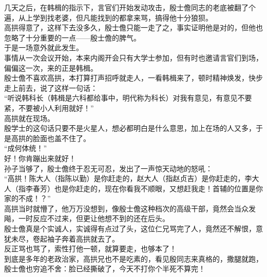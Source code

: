 \begin{multicols}{\theparacolNo}
几天之后，在韩楫的指示下，言官们开始发动攻击，殷士儋同志的老底被翻了个遍，从上学到找老婆，但凡能找到的都拿来骂，搞得他十分狼狈。\\

高拱得意了，这样下去没多久，殷士儋只能一走了之，事实证明他是对的，但他也忽略了十分重要的一点——殷士儋的脾气。\\

于是一场意外就此发生。\\

事情从一次会议开始，本来内阁开会只有大学士参加，但有时也邀请言官们到场，偏偏这一次，来的正是韩楫。\\

殷士儋不喜欢高拱，本打算打声招呼就走人，一看韩楫来了，顿时精神焕发，快步走上前去，说了这样一句话：\\

“听说韩科长（韩楫是六科都给事中，明代称为科长）对我有意见，有意见不要紧，不要被小人利用就好！”\\

高拱就在现场。\\

殷学士的这句话只要不是火星人，想必都明白是什么意思，加上在场的人又多，于是高拱的脸面也盖不住了。\\

“成何体统！”\\

好！你肯蹦出来就好！\\

孙子当够了，殷士儋终于忍无可忍，发出了一声惊天动地的怒吼：\\

“高拱！陈大人（指陈以勤）是你赶走的，赵大人（指赵贞吉）是你赶走的，李大人（指李春芳）也是你赶走的，现在你看我不顺眼，又想赶我走！首辅的位置是你家的不成！？”\\

高拱当时就懵了，他万万没想到，像殷士儋这种档次的高级干部，竟然会当众发飚，一时反应不过来，但更让他想不到的还在后头。\\

殷士儋真是个实诚人，实诚得有点过了头，这位仁兄骂完了人，竟然还不解恨，意犹未尽，卷起袖子奔着高拱就去了。\\

反正骂也骂了，索性打他一顿，就算要走，也够本了！\\

到底是多年的老政治家，高拱兄也不是吃素的，看见殷同志来真格的，撒腿就跑，殷士儋也穷追不舍：脸已经撕破了，今天不打你个半死不算完！\\


\end{multicols}
